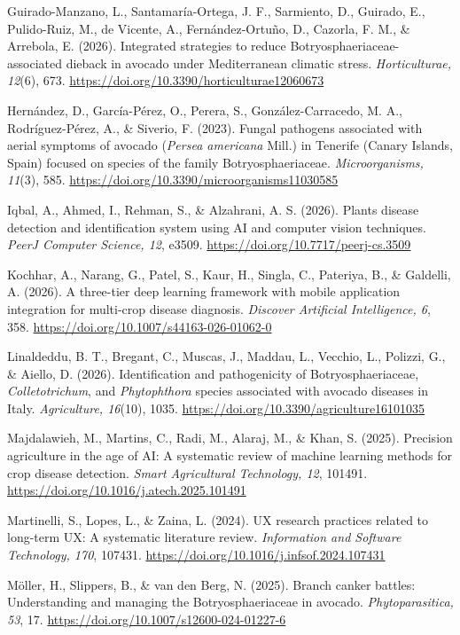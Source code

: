\documentclass[11pt]{article}
\begin{document}
\begin{list}{}{\leftmargin=1.27cm \itemindent=-1.27cm \itemsep=4pt \parsep=0pt}
\item Guirado-Manzano, L., Santamaría-Ortega, J. F., Sarmiento, D., Guirado, E., Pulido-Ruiz, M., de Vicente, A., Fernández-Ortuño, D., Cazorla, F. M., \& Arrebola, E. (2026). Integrated strategies to reduce Botryosphaeriaceae-associated dieback in avocado under Mediterranean climatic stress. \textit{Horticulturae, 12}(6), 673. \url{https://doi.org/10.3390/horticulturae12060673}
\item Hernández, D., García-Pérez, O., Perera, S., González-Carracedo, M. A., Rodríguez-Pérez, A., \& Siverio, F. (2023). Fungal pathogens associated with aerial symptoms of avocado (\textit{Persea americana} Mill.) in Tenerife (Canary Islands, Spain) focused on species of the family Botryosphaeriaceae. \textit{Microorganisms, 11}(3), 585. \url{https://doi.org/10.3390/microorganisms11030585}
\item Iqbal, A., Ahmed, I., Rehman, S., \& Alzahrani, A. S. (2026). Plants disease detection and identification system using AI and computer vision techniques. \textit{PeerJ Computer Science, 12}, e3509. \url{https://doi.org/10.7717/peerj-cs.3509}
\item Kochhar, A., Narang, G., Patel, S., Kaur, H., Singla, C., Pateriya, B., \& Galdelli, A. (2026). A three-tier deep learning framework with mobile application integration for multi-crop disease diagnosis. \textit{Discover Artificial Intelligence, 6}, 358. \url{https://doi.org/10.1007/s44163-026-01062-0}
\item Linaldeddu, B. T., Bregant, C., Muscas, J., Maddau, L., Vecchio, L., Polizzi, G., \& Aiello, D. (2026). Identification and pathogenicity of Botryosphaeriaceae, \textit{Colletotrichum}, and \textit{Phytophthora} species associated with avocado diseases in Italy. \textit{Agriculture, 16}(10), 1035. \url{https://doi.org/10.3390/agriculture16101035}
\item Majdalawieh, M., Martins, C., Radi, M., Alaraj, M., \& Khan, S. (2025). Precision agriculture in the age of AI: A systematic review of machine learning methods for crop disease detection. \textit{Smart Agricultural Technology, 12}, 101491. \url{https://doi.org/10.1016/j.atech.2025.101491}
\item Martinelli, S., Lopes, L., \& Zaina, L. (2024). UX research practices related to long-term UX: A systematic literature review. \textit{Information and Software Technology, 170}, 107431. \url{https://doi.org/10.1016/j.infsof.2024.107431}
\item Möller, H., Slippers, B., \& van den Berg, N. (2025). Branch canker battles: Understanding and managing the Botryosphaeriaceae in avocado. \textit{Phytoparasitica, 53}, 17. \url{https://doi.org/10.1007/s12600-024-01227-6}

\end{list}
\end{document}
